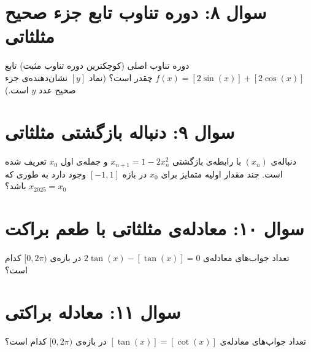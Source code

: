 \documentclass[12pt]{article}
\begin{document}
	
	\vspace{1cm}
	\hrulefill
	\vspace{1cm}
	\section*{سوال ۸: دوره تناوب تابع جزء صحیح مثلثاتی}
	دوره تناوب اصلی (کوچکترین دوره تناوب مثبت) تابع \( f(x) = [2\sin(x)] + [2\cos(x)] \) چقدر است؟ (نماد \( [y] \) نشان‌دهنده‌ی جزء صحیح عدد \(y\) است.)
	
	
	\vspace{1cm}
	\vspace{1cm}
	\section*{سوال ۹: دنباله بازگشتی مثلثاتی}
	دنباله‌ی \( (x_n) \) با رابطه‌ی بازگشتی \( x_{n+1} = 1 - 2x_n^2 \) و جمله‌ی اول \( x_0 \) تعریف شده است. چند مقدار اولیه متمایز برای \( x_0 \) در بازه \( [-1, 1] \) وجود دارد به طوری که \( x_{2025} = x_0 \) باشد؟
	
	
	
	\vspace{1cm}
	\hrulefill
	\vspace{1cm}
	\section*{سوال ۱۰: معادله‌ی مثلثاتی با طعم براکت}
	تعداد جواب‌های معادله‌ی \( 2\tan(x) - [\tan(x)] = 0 \) در بازه‌ی \( [0, 2\pi) \) کدام است؟
	
	
	\vspace{1cm}
	\hrulefill
	\vspace{1cm}
	\section*{سوال ۱۱: معادله براکتی }
	تعداد جواب‌های معادله‌ی \( [\tan(x)] = [\cot(x)] \) در بازه‌ی \( [0, 2\pi) \) کدام است؟
	
\end{document}
